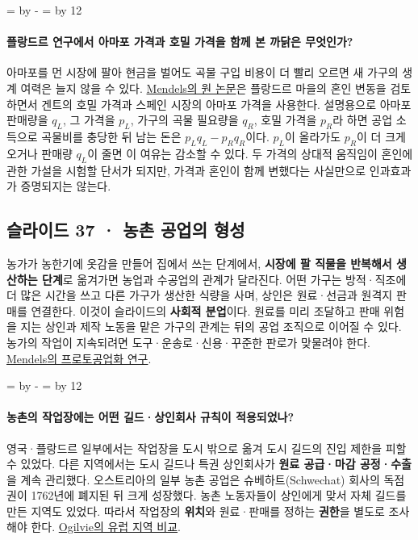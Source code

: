 \documentclass[10pt,a4paper]{article}
\newcommand{\ReserveQuestionSpace}{%
  \par\begingroup
  \dimen0=\pagegoal \advance\dimen0 by -\pagetotal
  \dimen2=\baselineskip \multiply\dimen2 by 12
  \ifdim\dimen0<\dimen2 \newpage\fi
  \endgroup}
\begin{document}
\ReserveQuestionSpace
\paragraph{플랑드르 연구에서 아마포 가격과 호밀 가격을 함께 본 까닭은 무엇인가?}
아마포를 먼 시장에 팔아 현금을 벌어도 곡물 구입 비용이 더 빨리 오르면 새 가구의 생계 여력은 늘지 않을 수 있다. \href{https://www.cambridge.org/core/journals/journal-of-economic-history/article/abs/protoindustrialization-the-first-phase-of-the-industrialization-process/041BAB14C81FD40403F9D10A6E85DD86}{Mendels의 원 논문}은 플랑드르 마을의 혼인 변동을 검토하면서 겐트의 호밀 가격과 스페인 시장의 아마포 가격을 사용한다. 설명용으로 아마포 판매량을 $q_L$, 그 가격을 $p_L$, 가구의 곡물 필요량을 $q_R$, 호밀 가격을 $p_R$라 하면 공업 소득으로 곡물비를 충당한 뒤 남는 돈은 $p_Lq_L-p_Rq_R$이다. $p_L$이 올라가도 $p_R$이 더 크게 오거나 판매량 $q_L$이 줄면 이 여유는 감소할 수 있다. 두 가격의 상대적 움직임이 혼인에 관한 가설을 시험할 단서가 되지만, 가격과 혼인이 함께 변했다는 사실만으로 인과효과가 증명되지는 않는다.\par

\subsection{슬라이드 37 · 농촌 공업의 형성}
농가가 농한기에 옷감을 만들어 집에서 쓰는 단계에서, \textbf{시장에 팔 직물을 반복해서 생산하는 단계}로 옮겨가면 농업과 수공업의 관계가 달라진다. 어떤 가구는 방적·직조에 더 많은 시간을 쓰고 다른 가구가 생산한 식량을 사며, 상인은 원료·선금과 원격지 판매를 연결한다. 이것이 슬라이드의 \textbf{사회적 분업}이다. 원료를 미리 조달하고 판매 위험을 지는 상인과 제작 노동을 맡은 가구의 관계는 뒤의 공업 조직으로 이어질 수 있다. 농가의 작업이 지속되려면 도구·운송로·신용·꾸준한 판로가 맞물려야 한다. \href{https://www.cambridge.org/core/journals/journal-of-economic-history/article/abs/protoindustrialization-the-first-phase-of-the-industrialization-process/041BAB14C81FD40403F9D10A6E85DD86}{Mendels의 프로토공업화 연구}.\par

\ReserveQuestionSpace
\paragraph{농촌의 작업장에는 어떤 길드·상인회사 규칙이 적용되었나?}
영국·플랑드르 일부에서는 작업장을 도시 밖으로 옮겨 도시 길드의 진입 제한을 피할 수 있었다. 다른 지역에서는 도시 길드나 특권 상인회사가 \textbf{원료 공급·마감 공정·수출}을 계속 관리했다. 오스트리아의 일부 농촌 공업은 슈베하트(Schwechat) 회사의 독점권이 1762년에 폐지된 뒤 크게 성장했다. 농촌 노동자들이 상인에게 맞서 자체 길드를 만든 지역도 있었다. 따라서 작업장의 \textbf{위치}와 원료·판매를 정하는 \textbf{권한}을 별도로 조사해야 한다. \href{https://sheilaghogilvie.com/wp-content/uploads/publications/Ogilvie-1993-Proto-industrialization.pdf}{Ogilvie의 유럽 지역 비교}.\par
\end{document}
